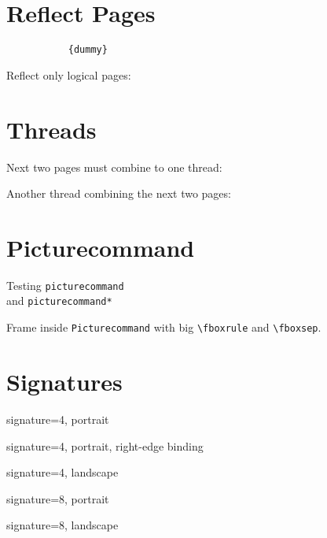 \section{Reflect Pages}
\begingroup
\verb||
\verb|           {dummy}|

%
\verb||

%
Reflect only logical pages:\par
\verb||

\endgroup


\begingroup
\section{Threads}
Next two pages must combine to one thread:


Another thread combining the next two pages:


\endgroup

\section{Picturecommand}
\begingroup
Testing \texttt{picturecommand}\\ and \texttt{picturecommand*}

\endgroup

\begingroup
Frame inside \texttt{Picturecommand} with big \verb|\fboxrule| and \verb|\fboxsep|.
\setlength\fboxrule{5pt}
\setlength\fboxsep{15pt}

\endgroup

\section{Signatures}
\begingroup
signature=4, portrait

signature=4, portrait, right-edge binding

signature=4, landscape

signature=8, portrait

signature=8, landscape

\endgroup

